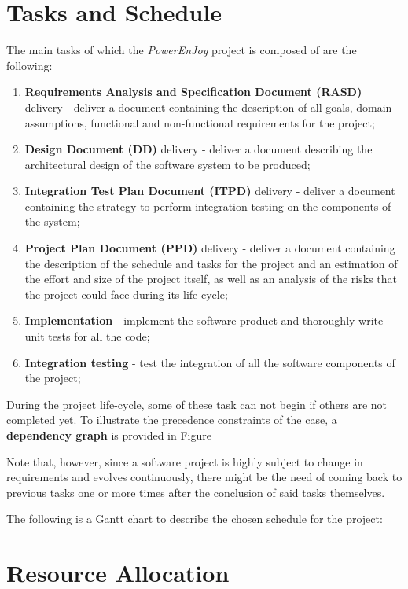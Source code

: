 \section{Tasks and Schedule}
The main tasks of which the \textit{PowerEnJoy} project is composed of are the following:
\begin{enumerate}
\item \textbf{Requirements Analysis and Specification Document (RASD)} delivery - deliver a document containing the description of all goals, domain assumptions, functional and non-functional requirements for the project;
\item \textbf{Design Document (DD)} delivery - deliver a document describing the architectural design of the software system to be produced;
\item \textbf{Integration Test Plan Document (ITPD)} delivery - deliver a document containing the strategy to perform integration testing on the components of the system;
\item \textbf{Project Plan Document (PPD)} delivery - deliver a document containing the description of the schedule and tasks for the project and an estimation of the effort and size of the project itself, as well as an analysis of the risks that the project could face during its life-cycle;
\item \textbf{Implementation} - implement the software product and thoroughly write unit tests for all the code;
\item \textbf{Integration testing} - test the integration of all the software components of the project;
\end{enumerate}

During the project life-cycle, some of these task can not begin if others are not completed yet. To illustrate the precedence constraints of the case, a \textbf{dependency graph} is provided in Figure %

Note that, however, since a software project is highly subject to change in requirements and evolves continuously, there might be the need of coming back to previous tasks one or more times after the conclusion of said tasks themselves.


The following is a Gantt chart to describe the chosen schedule for the project:


\section{Resource Allocation}